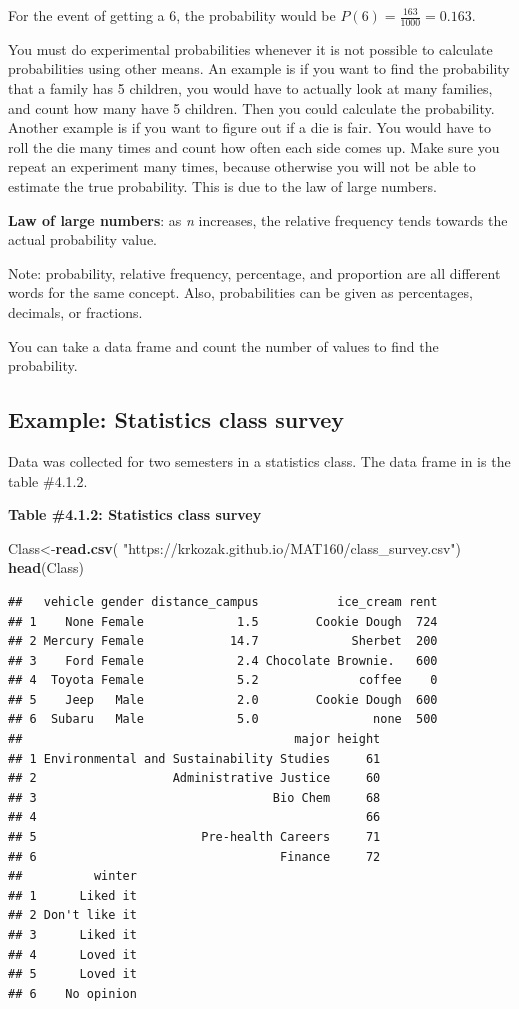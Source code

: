 \documentclass[
]{book}
\newenvironment{Shaded}{\begin{snugshade}}{\end{snugshade}}
\newcommand{\KeywordTok}[1]{\textcolor[rgb]{0.13,0.29,0.53}{\textbf{#1}}}
\newcommand{\NormalTok}[1]{#1}
\newcommand{\StringTok}[1]{\textcolor[rgb]{0.31,0.60,0.02}{#1}}
\begin{document}
For the event of getting a 6, the probability would be \(P(6)=\frac{163}{1000}=0.163\).

You must do experimental probabilities whenever it is not possible to calculate probabilities using other means. An example is if you want to find the probability that a family has 5 children, you would have to
actually look at many families, and count how many have 5 children. Then you could calculate the probability. Another example is if you want to figure out if a die is fair. You would have to roll the die many times and count how often each side comes up. Make sure you repeat an experiment many times, because otherwise you will not be able to estimate the true probability. This is due to the law of large numbers.

\textbf{Law of large numbers}: as \emph{n} increases, the relative frequency tends towards the actual probability value.

Note: probability, relative frequency, percentage, and proportion are all different words for the same concept. Also, probabilities can be given as percentages, decimals, or fractions.

You can take a data frame and count the number of values to find the probability.

\hypertarget{example-statistics-class-survey}{%
\subsection{Example: Statistics class survey}\label{example-statistics-class-survey}}

Data was collected for two semesters in a statistics class. The data frame in is the table \#4.1.2.

\textbf{Table \#4.1.2: Statistics class survey}

\begin{Shaded}
\begin{Highlighting}[]
\NormalTok{Class<-}\KeywordTok{read.csv}\NormalTok{(}
  \StringTok{"https://krkozak.github.io/MAT160/class_survey.csv"}\NormalTok{)}
\KeywordTok{head}\NormalTok{(Class)}
\end{Highlighting}
\end{Shaded}

\begin{verbatim}
##   vehicle gender distance_campus           ice_cream rent
## 1    None Female             1.5        Cookie Dough  724
## 2 Mercury Female            14.7             Sherbet  200
## 3    Ford Female             2.4 Chocolate Brownie.   600
## 4  Toyota Female             5.2              coffee    0
## 5    Jeep   Male             2.0        Cookie Dough  600
## 6  Subaru   Male             5.0                none  500
##                                      major height
## 1 Environmental and Sustainability Studies     61
## 2                   Administrative Justice     60
## 3                                 Bio Chem     68
## 4                                              66
## 5                       Pre-health Careers     71
## 6                                  Finance     72
##          winter
## 1      Liked it
## 2 Don't like it
## 3      Liked it
## 4      Loved it
## 5      Loved it
## 6    No opinion
\end{verbatim}
\end{document}
